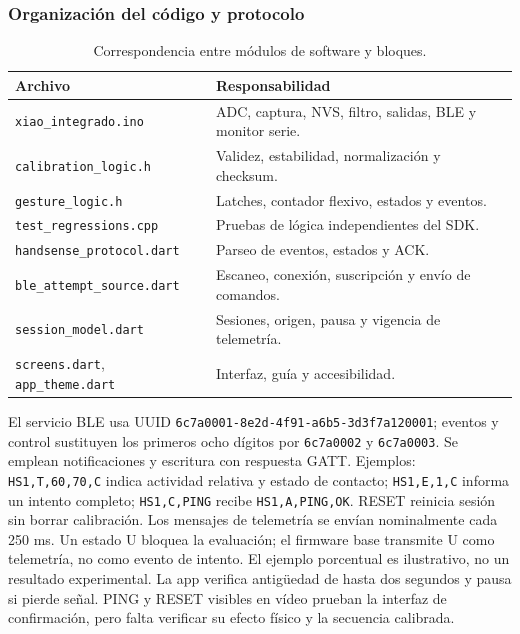 \documentclass[11pt,letterpaper]{article}
\newcommand{\tabsmall}{\fontsize{10}{12}\selectfont}
\begin{document}
\subsubsection{Organización del código y protocolo}
\begin{table}[htbp]\centering\tabsmall\caption{Correspondencia entre módulos de software y bloques.}\label{tab:modules}
\begin{tabularx}{\linewidth}{@{}l Y@{}}\toprule Archivo & Responsabilidad \\\midrule
\texttt{xiao\_integrado.ino} & ADC, captura, NVS, filtro, salidas, BLE y monitor serie.\\
\texttt{calibration\_logic.h} & Validez, estabilidad, normalización y checksum.\\
\texttt{gesture\_logic.h} & Latches, contador flexivo, estados y eventos.\\
\texttt{test\_regressions.cpp} & Pruebas de lógica independientes del SDK.\\
\texttt{handsense\_protocol.dart} & Parseo de eventos, estados y ACK.\\
\texttt{ble\_attempt\_source.dart} & Escaneo, conexión, suscripción y envío de comandos.\\
\texttt{session\_model.dart} & Sesiones, origen, pausa y vigencia de telemetría.\\
\texttt{screens.dart}, \texttt{app\_theme.dart} & Interfaz, guía y accesibilidad.\\\bottomrule\end{tabularx}\end{table}
El servicio BLE usa UUID \texttt{6c7a0001-8e2d-4f91-a6b5-3d3f7a120001}; eventos y control sustituyen los primeros ocho dígitos por \texttt{6c7a0002} y \texttt{6c7a0003}. Se emplean notificaciones y escritura con respuesta GATT. Ejemplos: \texttt{HS1,T,60,70,C} indica actividad relativa y estado de contacto; \texttt{HS1,E,1,C} informa un intento completo; \texttt{HS1,C,PING} recibe \texttt{HS1,A,PING,OK}. RESET reinicia sesión sin borrar calibración. Los mensajes de telemetría se envían nominalmente cada 250 ms. Un estado U bloquea la evaluación; el firmware base transmite U como telemetría, no como evento de intento. El ejemplo porcentual es ilustrativo, no un resultado experimental. La app verifica antigüedad de hasta dos segundos y pausa si pierde señal. PING y RESET visibles en vídeo prueban la interfaz de confirmación, pero falta verificar su efecto físico y la secuencia calibrada.
\end{document}

